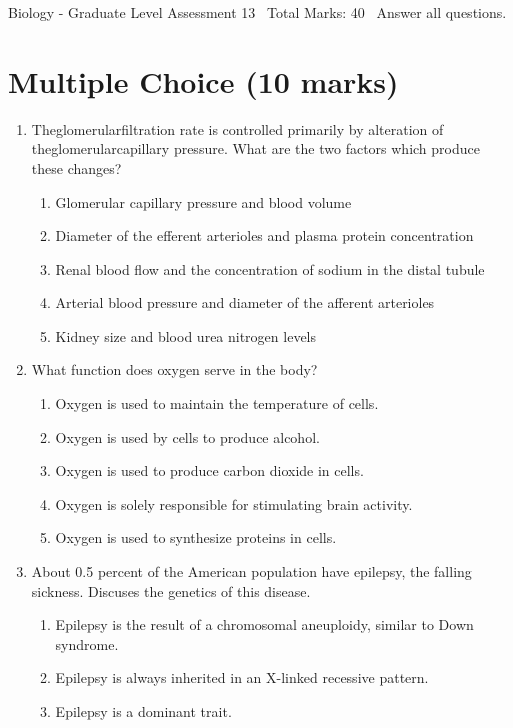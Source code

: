 \documentclass[12pt]{article}
\begin{document}
\begin{center}
Biology - Graduate Level Assessment 13 \
Total Marks: 40 \
Answer all questions.
\end{center}

\section*{Multiple Choice (10 marks)}
\begin{enumerate}[label=\arabic*.]
\item Theglomerularfiltration rate is controlled primarily by alteration of theglomerularcapillary pressure. What are the two factors which produce these changes?
\begin{enumerate}[label=(\alph*)]
    \item Glomerular capillary pressure and blood volume
    \item Diameter of the efferent arterioles and plasma protein concentration
    \item Renal blood flow and the concentration of sodium in the distal tubule
    \item Arterial blood pressure and diameter of the afferent arterioles
    \item Kidney size and blood urea nitrogen levels
\end{enumerate}
\item What function does oxygen serve in the body?
\begin{enumerate}[label=(\alph*)]
    \item Oxygen is used to maintain the temperature of cells.
    \item Oxygen is used by cells to produce alcohol.
    \item Oxygen is used to produce carbon dioxide in cells.
    \item Oxygen is solely responsible for stimulating brain activity.
    \item Oxygen is used to synthesize proteins in cells.
\end{enumerate}
\item About 0.5 percent of the American population have epilepsy, the falling sickness. Discuses the genetics of this disease.
\begin{enumerate}[label=(\alph*)]
    \item Epilepsy is the result of a chromosomal aneuploidy, similar to Down syndrome.
    \item Epilepsy is always inherited in an X-linked recessive pattern.
    \item Epilepsy is a dominant trait.

\end{enumerate}
\end{enumerate}
\end{document}
